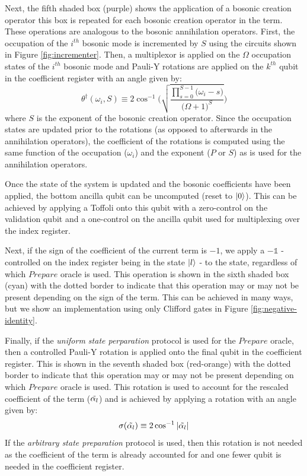 Next, the fifth shaded box (purple) shows the application of a bosonic creation operator this box is repeated for each bosonic creation operator in the term.
These operations are analogous to the bosonic annihilation operators.
First, the occupation of the $i^{th}$ bosonic mode is incremented by $S$ using the circuits shown in Figure \ref{fig:incrementer}.
Then, a multiplexor is applied on the $\Omega$ occupation states of the $i^{th}$ bosonic mode and Pauli-Y rotations are applied on the $k^{th}$ qubit in the coefficient register with an angle given by:
\begin{equation}
    \theta^\dagger(\omega_i, S) \equiv 2 \cos^{-1}{\Big(\sqrt{\frac{\prod_{s=0}^{S-1} \big( \omega_i - s \big)}{\big(\Omega + 1\big)^S}}\Big)}
\end{equation}
where $S$ is the exponent of the bosonic creation operator.
Since the occupation states are updated prior to the rotations (as opposed to afterwards in the annihilation operators), the coefficient of the rotations is computed using the same function of the occupation ($\omega_i$) and the exponent ($P$ or $S$) as is used for the annihilation operators.

Once the state of the system is updated and the bosonic coefficients have been applied, the bottom ancilla qubit can be uncomputed (reset to $\ket{0}$).
This can be achieved by applying a Toffoli onto this qubit with a zero-control on the validation qubit and a one-control on the ancilla qubit used for multiplexing over the index register.

Next, if the sign of the coefficient of the current term is $-1$, we apply a $- \mathds{1}$ - controlled on the index register being in the state $\ket{l}$ - to the state, regardless of which $Prepare$ oracle is used.
This operation is shown in the sixth shaded box (cyan) with the dotted border to indicate that this operation may or may not be present depending on the sign of the term.
This can be achieved in many ways, but we show an implementation using only Clifford gates in Figure \ref{fig:negative-identity}.

Finally, if the \textit{uniform state perparation} protocol is used for the $Prepare$ oracle, then a controlled Pauli-Y rotation is applied onto the final qubit in the coefficient register.
This is shown in the seventh shaded box (red-orange) with the dotted border to indicate that this operation may or may not be present depending on which $Prepare$ oracle is used.
This rotation is used to account for the rescaled coefficient of the term ($\Tilde{\alpha_l}$) and is achieved by applying a rotation with an angle given by:
\begin{equation}
    \sigma(\Tilde{\alpha_l}) \equiv 2 \cos^{-1}{|\Tilde{\alpha_l}|}
\end{equation}
If the \textit{arbitrary state preparation} protocol is used, then this rotation is not needed as the coefficient of the term is already accounted for and one fewer qubit is needed in the coefficient register.

